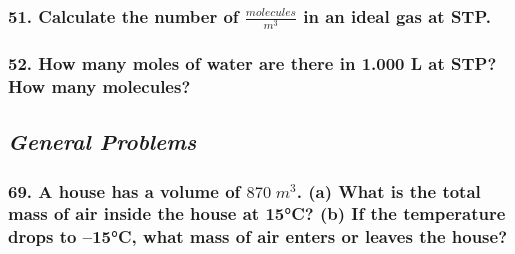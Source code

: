 \documentclass{article}
\begin{document}
\subsubsection*{
    51. Calculate the number of $\frac{molecules}{m^3}$ in an ideal gas at STP.
}
\subsubsection*{
    52. How many moles of water are there in 1.000 L at STP? How many molecules?
}
\newpage
\begin{center}
    \subsection*{\textbf{\textit{General Problems}}}
\end{center}
\subsubsection*{
    69. A house has a volume of $870\;m^3$. (a) What is the total mass of air inside
    the house at 15°C? (b) If the temperature drops to –15°C, what mass of air
    enters or leaves the house?
}
\end{document}
